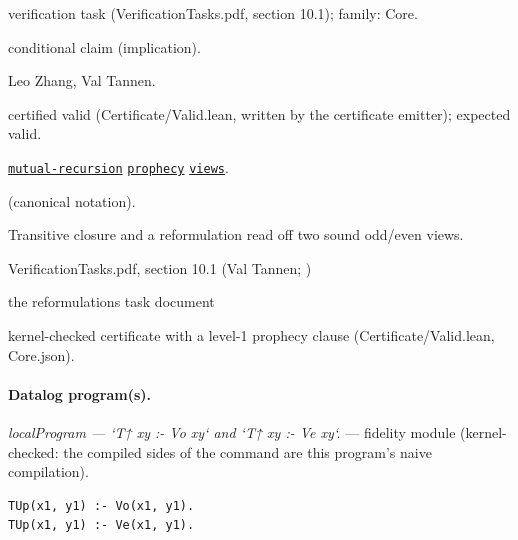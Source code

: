\documentclass[10pt]{article}
\begin{document}
\begin{description}[leftmargin=2.6cm,style=nextline,itemsep=1pt]

\item[Category] verification task (VerificationTasks.pdf, section 10.1); family: Core.

\item[Kind] conditional claim (implication).

\item[Contributors] Leo Zhang, Val Tannen.

\item[Status] certified valid (Certificate/Valid.lean, written by the certificate emitter); expected valid.

\item[Tags] \hyperref[tag:mutual-recursion]{\texttt{mutual-recursion}} \hyperref[tag:prophecy]{\texttt{prophecy}} \hyperref[tag:views]{\texttt{views}}.

\item[Input]  (canonical notation).

\item[Summary] Transitive closure and a reformulation read off two sound odd/even views.

\item[Sources] {\raggedright VerificationTasks.pdf, section 10.1 (Val Tannen; ) \par the reformulations task document\par}

\item[Prophecy] kernel-checked certificate with a level-1 prophecy clause (Certificate/Valid.lean, Core.json).

\end{description}

\paragraph{Datalog program(s).}

{\raggedright\textit{localProgram --- `T↑ xy :- Vo xy` and `T↑ xy :- Ve xy`.} --- fidelity module (kernel-checked: the compiled sides of the command are this program's naive compilation).\par}

\begin{Verbatim}[fontsize=\scriptsize,breaklines=true,breakanywhere=true,frame=single,framesep=1.5mm]
TUp(x1, y1) :- Vo(x1, y1).
TUp(x1, y1) :- Ve(x1, y1).
\end{Verbatim}
\end{document}
